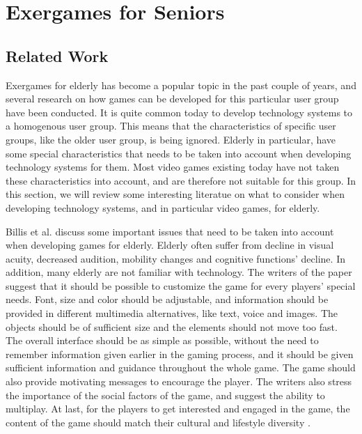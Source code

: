 \chapter{Exergames for Seniors}
\section{Related Work}
Exergames for elderly has become a popular topic in the past couple of years, and several research on how games can be developed for this particular user group have been conducted. It is quite common today to develop technology systems to a homogenous user group. This means that the characteristics of specific user groups, like the older user group, is being ignored. Elderly in particular, have some special characteristics that needs to be taken into account when developing technology systems for them. Most video games existing today have not taken these characteristics into account, and are therefore not suitable for this group. In this section, we will review some interesting literatue on what to consider when developing technology systems, and in particular video games, for elderly.  

Billis et al. \cite{Billis} discuss some important issues that need to be taken into account when developing games for elderly. Elderly often suffer from decline in visual acuity, decreased audition, mobility changes and cognitive functions’ decline. In addition, many elderly are not familiar with technology. The writers of the paper suggest that it should be possible to customize the game for every players’ special needs. Font, size and color should be adjustable, and information should be provided in different multimedia alternatives, like text, voice and images. The objects should be of sufficient size and the elements should not move too fast. The overall interface should be as simple as possible, without the need to remember information given earlier in the gaming process, and it should be given sufficient information and guidance throughout the whole game. The game should also provide motivating messages to encourage the player. The writers also stress the importance of the social factors of the game, and suggest the ability to multiplay. At last, for the players to get interested and engaged in the game, the content of the game should match their cultural and lifestyle diversity \cite{Billis}.

